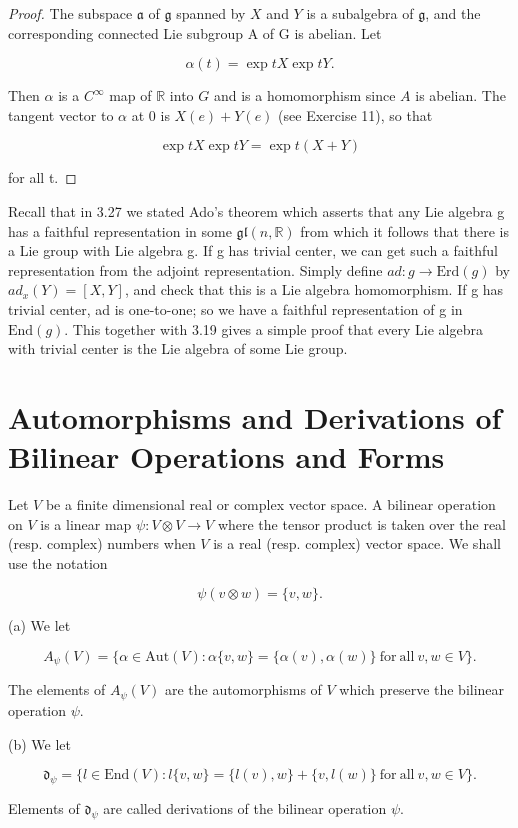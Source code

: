 \begin{proof}
The subspace $\mathfrak{a}$ of $\mathfrak{g}$ spanned by $X$ and $Y$ is a subalgebra of $\mathfrak{g}$, and the corresponding connected Lie subgroup A of G is abelian. Let

\[
\alpha(t)=\exp t X\exp t Y.
\]

Then $\alpha$ is a $C^{\infty}$ map of $\mathbb{R}$ into $G$ and is a homomorphism since $A$ is abelian. The tangent vector to $\alpha$ at $0$ is $X(e) + Y(e)$ (see Exercise 11), so that

\[
\exp tX\exp tY=\exp t(X+Y)
\]

for all t.

\end{proof}

\begin{remarks}\label{thm:3.52}
Recall that in 3.27 we stated Ado's theorem which asserts that any Lie algebra g has a faithful representation in some $\mathfrak{gl}(n,\mathbb{R})$ from which it follows that there is a Lie group with Lie algebra g. If g has trivial center, we can get such a faithful representation from the adjoint representation. Simply define $ad:g \to \mathrm{Erd}(g)$ by $ad_x(Y) = [X, Y]$, and check that this is a Lie algebra homomorphism. If g has trivial center, ad is one-to-one; so we have a faithful representation of g in $\mathrm{End}(g)$. This together with 3.19 gives a simple proof that every Lie algebra with trivial center is the Lie algebra of some Lie group. 

\end{remarks}

\section{Automorphisms and Derivations of Bilinear Operations and Forms}

\begin{definition}\label{thm:3.53}
Let $V$ be a finite dimensional real or complex vector space. A bilinear operation on $V$ is a linear map $\psi: V\otimes V \to V$ where the tensor product is taken over the real (resp. complex) numbers when $V$ is a real (resp. complex) vector space. We shall use the notation

\[
\psi(v\otimes w)=\{v,w\}.
\]

(a) We let

\[
A_{\psi}(V)=\{\alpha\in\mathrm{Aut}(V)\colon\alpha\{v,w\}=\{\alpha(v),\alpha(w)\}\mathrm{~for~all~}v,w\in V\}.
\]

The elements of $A_{\psi}(V)$ are the automorphisms of $V$ which preserve the bilinear operation $\psi$.

(b) We let

\[
\mathfrak{d}_{\psi}=\{l\in\mathrm{End}(V)\colon l\{v,w\}=\{l(v),w\}+\{v,l(w)\}\mathrm{~for~all~}v,w\in V\}.
\]

Elements of  $ \mathfrak{d}_{\psi} $ are called derivations of the bilinear operation  $ \psi $.

\end{definition}

